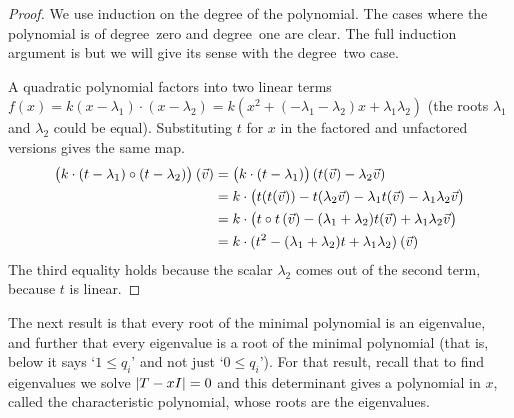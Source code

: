 \begin{proof}
We use induction on the degree of the polynomial.
The cases where the polynomial is of
degree~zero and degree~one are clear.
The full induction argument is 
but we will give its sense with the degree~two case.

A quadratic polynomial factors into two
linear terms \( f(x)=k(x-\lambda_1)\cdot(x-\lambda_2)
                    =k(x^2+(-\lambda_1-\lambda_2)x+\lambda_1\lambda_2) \)
(the roots $\lambda_1$ and $\lambda_2$ could be equal).
Substituting \( t \) 
for \( x \) in the factored and
unfactored versions gives the same map.
\begin{align*}
   \bigl(k\cdot(t-\lambda_1)\mathbin{\circ} (t-\lambda_2)\bigr)\>(\vec{v})
   &=\bigl(k\cdot(t-\lambda_1)\bigr)\,(t(\vec{v})-\lambda_2\vec{v})    \\
   &=k\cdot\bigl(t(t(\vec{v}))-t(\lambda_2\vec{v})
      -\lambda_1 t(\vec{v})-\lambda_1\lambda_2\vec{v}\bigr)    \\
   &=k\cdot \bigl(t\mathbin{\circ} t\,(\vec{v})-(\lambda_1+\lambda_2)t(\vec{v})
          +\lambda_1\lambda_2\vec{v}\bigr)                    \\
   &=k\cdot(t^2-(\lambda_1+\lambda_2)t+\lambda_1\lambda_2)\>(\vec{v})
\end{align*}
The third equality holds because the scalar $\lambda_2$  comes out of the
second term, because \( t \) is linear.
\end{proof}


The next result is that
every root of the minimal polynomial is an eigenvalue, and further
that every eigenvalue is a root of the minimal polynomial 
(that is, below it says `$1\leq q_i$' and 
not just `$0\leq q_i$').
For that result, recall that to find eigenvalues
we solve $\deter{T-xI}=0$ and 
this determinant gives a polynomial in $x$, 
called the characteristic polynomial, 
whose roots are the eigenvalues.

